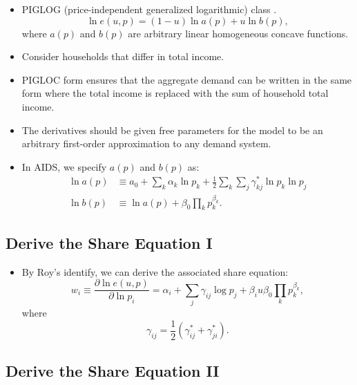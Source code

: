 \documentclass[
]{book}
\providecommand{\tightlist}{%
  \setlength{\itemsep}{0pt}\setlength{\parskip}{0pt}}
\begin{document}
\begin{itemize}
\tightlist
\item
  PIGLOG (price-independent generalized logarithmic) class \citep{Muellbauer1976}.
  \begin{equation}
  \ln e(u, p) = (1 - u) \ln a(p) + u\ln b(p),
  \end{equation}
  where \(a(p)\) and \(b(p)\) are arbitrary linear homogeneous concave functions.
\item
  Consider households that differ in total income.
\item
  PIGLOC form ensures that the aggregate demand can be written in the same form where the total income is replaced with the sum of household total income.
\item
  The derivatives should be given free parameters for the model to be an arbitrary first-order approximation to any demand system.
\item
  In AIDS, we specify \(a(p)\) and \(b(p)\) as:
  \begin{equation}
  \begin{split}
  \ln a(p) &\equiv a_0 + \sum_{k} \alpha_k \ln p_k + \frac{1}{2}\sum_{k} \sum_{j} \gamma_{kj}^* \ln p_k \ln p_j\\
  \ln b(p) &\equiv \ln a(p) + \beta_0  \prod_{k} p_k^{\beta_k}.
  \end{split}
  \end{equation}
\end{itemize}

\hypertarget{derive-the-share-equation-i}{%
\subsection{Derive the Share Equation I}\label{derive-the-share-equation-i}}

\begin{itemize}
\tightlist
\item
  By Roy's identify, we can derive the associated share equation:
  \begin{equation}
  w_i \equiv \frac{\partial \ln e(u, p)}{\partial \ln p_i} = \alpha_i + \sum_{j} \gamma_{ij} \log p_j + \beta_i u \beta_0 \prod_{k} p_k^{\beta_k},
  \end{equation}
  where
  \begin{equation}
  \gamma_{ij} = \frac{1}{2}(\gamma_{ij}^* + \gamma_{ji}^*).
  \end{equation}
\end{itemize}

\hypertarget{derive-the-share-equation-ii}{%
\subsection{Derive the Share Equation II}\label{derive-the-share-equation-ii}}
\end{document}
